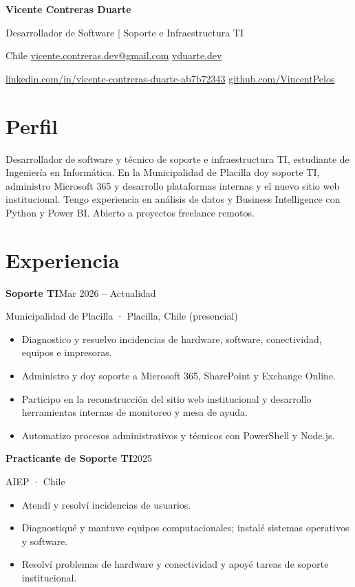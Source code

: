 \documentclass[10pt,a4paper]{article}
\newcommand{\entry}[3]{%
  \textbf{#1}\hfill #2\par
  #3\par
}
\begin{document}
\raggedright

{\LARGE\bfseries Vicente Contreras Duarte}\par
\vspace{3pt}
{\large Desarrollador de Software | Soporte e Infraestructura TI}\par
\vspace{4pt}
Chile \textbar{}
\href{mailto:vicente.contreras.dev@gmail.com}{vicente.contreras.dev@gmail.com} \textbar{}
\href{https://vduarte.dev}{vduarte.dev}\par
\href{https://www.linkedin.com/in/vicente-contreras-duarte-ab7b72343/}{linkedin.com/in/vicente-contreras-duarte-ab7b72343} \textbar{}
\href{https://github.com/VincentPelos}{github.com/VincentPelos}\par

\section{Perfil}
Desarrollador de software y técnico de soporte e infraestructura TI, estudiante de Ingeniería en Informática.
En la Municipalidad de Placilla doy soporte TI, administro Microsoft 365 y desarrollo plataformas internas
y el nuevo sitio web institucional. Tengo experiencia en análisis de datos y Business Intelligence con Python
y Power BI. Abierto a proyectos freelance remotos.

\section{Experiencia}
\entry{Soporte TI}{Mar 2026 -- Actualidad}{Municipalidad de Placilla · Placilla, Chile (presencial)}
\begin{itemize}
  \item Diagnostico y resuelvo incidencias de hardware, software, conectividad, equipos e impresoras.
  \item Administro y doy soporte a Microsoft 365, SharePoint y Exchange Online.
  \item Participo en la reconstrucción del sitio web institucional y desarrollo herramientas internas de monitoreo y mesa de ayuda.
  \item Automatizo procesos administrativos y técnicos con PowerShell y Node.js.
\end{itemize}
\vspace{4pt}
\entry{Practicante de Soporte TI}{2025}{AIEP · Chile}
\begin{itemize}
  \item Atendí y resolví incidencias de usuarios.
  \item Diagnostiqué y mantuve equipos computacionales; instalé sistemas operativos y software.
  \item Resolví problemas de hardware y conectividad y apoyé tareas de soporte institucional.
\end{itemize}
\end{document}
